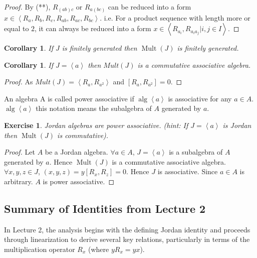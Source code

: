 \documentclass{article}
\newtheorem{corollary}[theorem]{Corollary}
\newtheorem{exercise}[theorem]{Exercise}
\def\<{\mathop{\langle}}
\def\>{\mathop{\rangle}}
\begin{document}
\begin{proof} 
By (**), $ R_{(a b) c} $ or $ R_{a (b c)} $ can be reduced into a form $ x \in \< R_{a}, R_{b}, R_{c}, R_{ab}, R_{ac}, R_{bc} \> $. i.e. For a product sequence with length more or equal to $ 2 $, it can always be reduced into a form $ x \in \< R_{a_i}, R_{a_ia_j}| i,j \in I\> $.
\end{proof}

\begin{corollary}
If $ J $ is finitely generated then $ \operatorname{Mult}(J) $ is finitely generated.
\end{corollary}

\begin{corollary}
If $ J=\< a\> $ then $ Mult(J) $ is a commutative associative algebra.
\end{corollary}

\begin{proof} 
As $ Mult(J)=\< R_a, R_{a^2} \> $ and $ [R_a, R_{a^2}]=0 $.  
\end{proof}

\begin{definition} 
An algebra A is called power associative if $ \operatorname{alg}\< a \> $ is associative for any $ a\in A $. $  \operatorname{alg} \<a \> $ this notation means the subalgebra of $ A $ generated by $ a $.    
\end{definition}

\begin{exercise}
Jordan algebras are power associative. (hint: If $ J=\<a \> $ is Jordan then $ \operatorname{Mult}(J) $ is commutative).
\end{exercise}

\begin{proof} 
Let $ A $ be a Jordan algebra. $ \forall a \in A $, $ J=\<a \> $ is a subalgebra of $ A $ generated by $ a $. Hence $ \operatorname{Mult}(J) $ is a commutative associative algebra. $ \forall x,y,z \in J $, $ (x,y,z)=y[R_x, R_z]=0 $. Hence $ J $ is associative. Since $ a \in A $ is arbitrary. $ A $ is power associative.
\end{proof}

\subsection*{Summary of Identities from Lecture 2}

In Lecture 2, the analysis begins with the defining Jordan identity and proceeds through linearization to derive several key relations, particularly in terms of the multiplication operator $R_x$ (where $y R_x = yx$).
\end{document}

